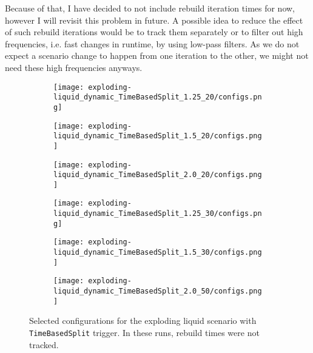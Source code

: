 \documentclass[]{article}
\begin{document}
Because of that, I have decided to not include rebuild iteration times for now, however I will revisit this problem in future. A possible idea to reduce the effect of such rebuild iterations would be to track them separately or to filter out high frequencies, i.e. fast changes in runtime, by using low-pass filters. As we do not expect a scenario change to happen from one iteration to the other, we might not need these high frequencies anyways.

\begin{figure}[H]
	\begin{center}
		\begin{subfigure}[b]{0.3\textwidth}
			\texttt{[image: exploding-liquid\_dynamic\_TimeBasedSplit\_1.25\_20/configs.png]}
		\end{subfigure}
		\begin{subfigure}[b]{0.3\textwidth}
			\texttt{[image: exploding-liquid\_dynamic\_TimeBasedSplit\_1.5\_20/configs.png]}
		\end{subfigure}
		\begin{subfigure}[b]{0.3\textwidth}
			\texttt{[image: exploding-liquid\_dynamic\_TimeBasedSplit\_2.0\_20/configs.png]}
		\end{subfigure}
	\end{center}
	\begin{center}
		\begin{subfigure}[b]{0.3\textwidth}
			\texttt{[image: exploding-liquid\_dynamic\_TimeBasedSplit\_1.25\_30/configs.png]}
		\end{subfigure}
		\begin{subfigure}[b]{0.3\textwidth}
			\texttt{[image: exploding-liquid\_dynamic\_TimeBasedSplit\_1.5\_30/configs.png]}
		\end{subfigure}
		\begin{subfigure}[b]{0.3\textwidth}
			\texttt{[image: exploding-liquid\_dynamic\_TimeBasedSplit\_2.0\_50/configs.png]}
		\end{subfigure}
	\end{center}
	\caption[]{Selected configurations for the exploding liquid scenario with \texttt{TimeBasedSplit} trigger. In these runs, rebuild times were not tracked.}
	\label{expl_liquid_configs_dyn_split_no_rebuild}
\end{figure}
\end{document}
